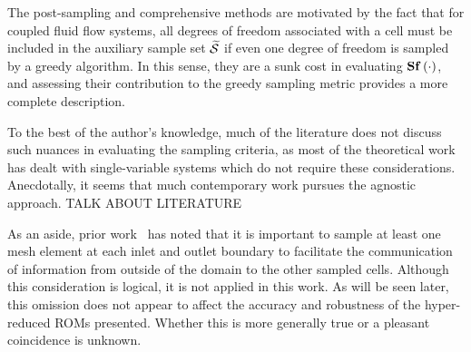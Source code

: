 The post-sampling and comprehensive methods are motivated by the fact that for coupled fluid flow systems, all degrees of freedom associated with a cell must be included in the auxiliary sample set $\mathcal{\widetilde{S}}$ if even one degree of freedom is sampled by a greedy algorithm. In this sense, they are a sunk cost in evaluating $\mathbf{S} \mathbf{f} \left(\cdot\right)$, and assessing their contribution to the greedy sampling metric provides a more complete description.

To the best of the author's knowledge, much of the literature does not discuss such nuances in evaluating the sampling criteria, as most of the theoretical work has dealt with single-variable systems which do not require these considerations. Anecdotally, it seems that much contemporary work pursues the agnostic approach. {\color{red}TALK ABOUT LITERATURE}


As an aside, prior work~\cite{Carlberg2013} has noted that it is important to sample at least one mesh element at each inlet and outlet boundary to facilitate the communication of information from outside of the domain to the other sampled cells. Although this consideration is logical, it is not applied in this work. As will be seen later, this omission does not appear to affect the accuracy and robustness of the hyper-reduced ROMs presented. Whether this is more generally true or a pleasant coincidence is unknown.

